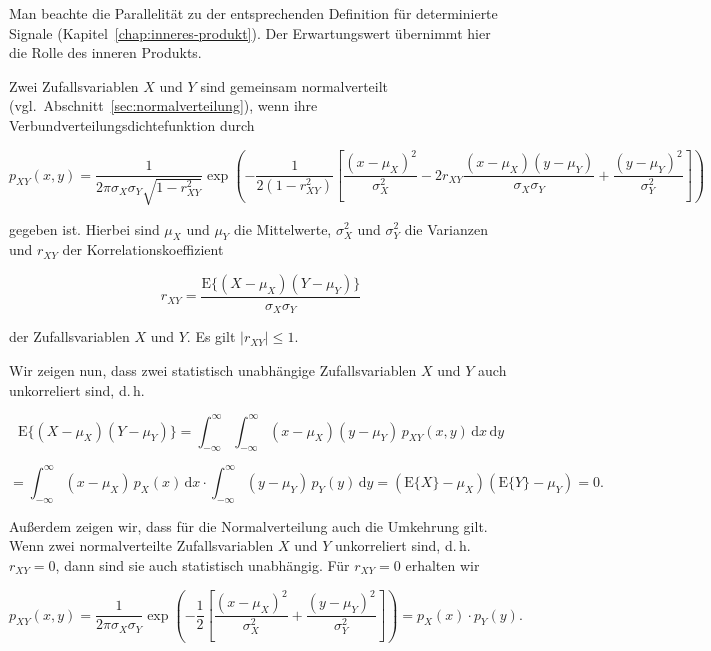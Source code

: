 \begin{bemerkung}
Man beachte die Parallelität zu der entsprechenden Definition für determinierte Signale (Kapitel~\ref{chap:inneres-produkt}). Der Erwartungswert übernimmt hier die Rolle des inneren Produkts.
\end{bemerkung}

\begin{beispiel}
Zwei Zufallsvariablen $X$ und $Y$ sind gemeinsam normalverteilt (vgl.\ Abschnitt~\ref{sec:normalverteilung}), wenn ihre Verbundverteilungsdichtefunktion durch

$$
p_{XY}(x,y) = \frac{1}{2\pi\sigma_X\sigma_Y\sqrt{1-r_{XY}^2}} \exp\!\left(-\frac{1}{2(1-r_{XY}^2)}\left[\frac{(x-\mu_X)^2}{\sigma_X^2} - 2r_{XY}\frac{(x-\mu_X)(y-\mu_Y)}{\sigma_X\sigma_Y} + \frac{(y-\mu_Y)^2}{\sigma_Y^2}\right]\right)
$$

gegeben ist. Hierbei sind $\mu_X$ und $\mu_Y$ die Mittelwerte, $\sigma_X^2$ und $\sigma_Y^2$ die Varianzen und $r_{XY}$ der Korrelationskoeffizient

$$
r_{XY} = \frac{\mathrm{E}\{(X-\mu_X)(Y-\mu_Y)\}}{\sigma_X\sigma_Y}
$$

der Zufallsvariablen $X$ und $Y$. Es gilt $|r_{XY}| \leq 1$.




\end{beispiel}

\begin{beweis}
Wir zeigen nun, dass zwei statistisch unabhängige Zufallsvariablen $X$ und $Y$ auch unkorreliert sind, d.\,h.

$$
\mathrm{E}\{(X-\mu_X)(Y-\mu_Y)\} = \int_{-\infty}^{\infty}\int_{-\infty}^{\infty} (x-\mu_X)(y-\mu_Y)\,p_{XY}(x,y)\,\mathrm{d}x\,\mathrm{d}y
$$

$$
= \int_{-\infty}^{\infty} (x-\mu_X)\,p_X(x)\,\mathrm{d}x \cdot \int_{-\infty}^{\infty} (y-\mu_Y)\,p_Y(y)\,\mathrm{d}y
= (\mathrm{E}\{X\} - \mu_X)(\mathrm{E}\{Y\} - \mu_Y) = 0.
$$

Außerdem zeigen wir, dass für die Normalverteilung auch die Umkehrung gilt. Wenn zwei normalverteilte Zufallsvariablen $X$ und $Y$ unkorreliert sind, d.\,h.\ $r_{XY} = 0$, dann sind sie auch statistisch unabhängig. Für $r_{XY} = 0$ erhalten wir

$$
p_{XY}(x,y) = \frac{1}{2\pi\sigma_X\sigma_Y} \exp\!\left(-\frac{1}{2}\left[\frac{(x-\mu_X)^2}{\sigma_X^2} + \frac{(y-\mu_Y)^2}{\sigma_Y^2}\right]\right)
= p_X(x) \cdot p_Y(y).
$$
\end{beweis}

